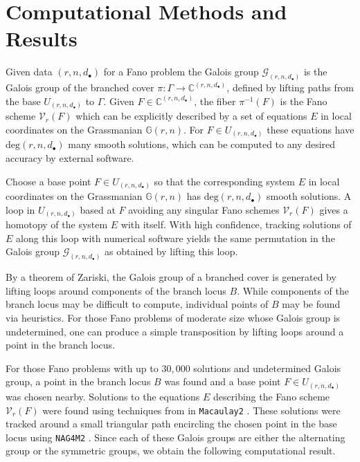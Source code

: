 \documentclass[12pt]{amsart}
\theoremstyle{definition}
\newcommand{\gr}{\mathbb{G}}
\newcommand{\gal}{\mathcal{G}}
\begin{document}
\section{Computational Methods and Results}
%
Given data $(r,n,d_\bullet)$ for a Fano problem the Galois group $\gal_{(r,n,d_\bullet)}$ is the Galois group of the branched cover $\pi:\Gamma\to\mathbb{C}^{(r,n,d_\bullet)}$, defined by lifting paths from the base $U_{(r,n,d_\bullet)}$ to $\Gamma$. Given $F\in\mathbb{C}^{(r,n,d_\bullet)}$, the fiber $\pi^{-1}(F)$ is the Fano scheme $\mathcal{V}_r(F)$ which can be explicitly described by a set of equations $E$ in local coordinates on the Grassmanian $\gr(r,n)$. For $F\in U_{(r,n,d_\bullet)}$ these equations have $\text{deg}(r,n,d_\bullet)$ many smooth solutions, which can be computed to any desired accuracy by external software. 

Choose a base point $F\in U_{(r,n,d_\bullet)}$ so that the corresponding system $E$ in local coordinates on the Grassmanian $\gr(r,n)$ has $\text{deg}(r,n,d_\bullet)$ smooth solutions. A loop in $U_{(r,n,d_\bullet)}$ based at $F$ avoiding any singular Fano schemes $\mathcal{V}_r(F)$ gives a homotopy of the system $E$ with itself. With high confidence, tracking solutions of $E$ along this loop with numerical software yields the same permutation in the Galois group $\mathcal{G}_{(r,n,d_\bullet)}$ as obtained by lifting this loop.

By a theorem of Zariski, the Galois group of a branched cover is generated by lifting loops around components of the branch locus $B$. While components of the branch locus may be difficult to compute, individual points of $B$ may be found via heuristics. For those Fano problems of moderate size whose Galois group is undetermined, one can produce a simple transposition by lifting loops around a point in the branch locus. 

For those Fano problems with up to $30,000$ solutions and undetermined Galois group, a point in the branch locus $B$ was found and a base point $F\in U_{(r,n,d_\bullet)}$ was chosen nearby. Solutions to the equations $E$ describing the Fano scheme $\mathcal{V}_r(F)$ were found using techniques from \cite{monodromySolve} in \texttt{Macaulay2} \cite{M2}. These solutions were tracked around a small triangular path encircling the chosen point in the base locus using \texttt{NAG4M2} \cite{NAG4M2}. Since each of these Galois groups are either the alternating group or the symmetric groups, we obtain the following computational result.
\end{document}
